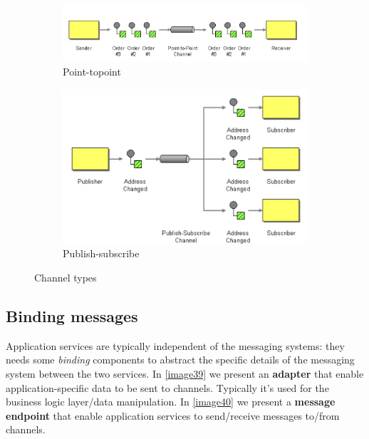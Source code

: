 \documentclass[10pt,a4paper]{report}
\begin{document}
\begin{figure}
	\centering
	\begin{subfigure}{.5\textwidth}
		\centering
		\includegraphics[width=.9\linewidth]{image37}
		\caption{Point-topoint}
		\label{image37}
	\end{subfigure}%
	\begin{subfigure}{.5\textwidth}
		\centering
		\includegraphics[width=.9\linewidth]{image38}
		\caption{Publish-subscribe}
		\label{image38}
	\end{subfigure}
	\caption{Channel types}
	\label{image38a}
\end{figure}

\subsection{Binding messages}
Application services are typically independent of the messaging systems: they needs some \textit{binding} components to abstract the specific details of the messaging system between the two services.
In \ref{image39} we present an \textbf{adapter} that enable application-specific data to be sent to channels. Typically it's used for the business logic layer/data manipulation. 
In \ref{image40} we present a \textbf{message endpoint} that enable application services to send/receive messages to/from channels. 
\end{document}
